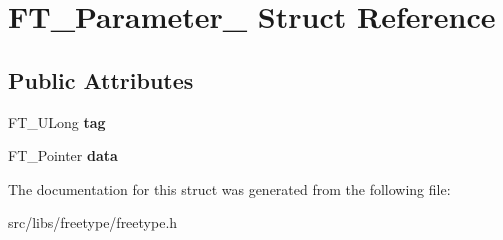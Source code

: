 \hypertarget{struct_f_t___parameter__}{
\section{FT\_\-Parameter\_\- Struct Reference}
\label{struct_f_t___parameter__}
}
\subsection*{Public Attributes}
\begin{DoxyCompactItemize}
\item 
\hypertarget{struct_f_t___parameter___a5a53ef2652683a2cd9ee6a0a694cb76b}{
FT\_\-ULong {\bfseries tag}}
\label{struct_f_t___parameter___a5a53ef2652683a2cd9ee6a0a694cb76b}

\item 
\hypertarget{struct_f_t___parameter___a930c8885bd25be8d054443153c817c13}{
FT\_\-Pointer {\bfseries data}}
\label{struct_f_t___parameter___a930c8885bd25be8d054443153c817c13}

\end{DoxyCompactItemize}


The documentation for this struct was generated from the following file:\begin{DoxyCompactItemize}
\item 
src/libs/freetype/freetype.h\end{DoxyCompactItemize}
